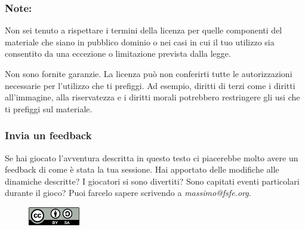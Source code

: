 \documentclass[letterpaper,twocolumn,openany,nodeprecatedcode]{dndbook}
\begin{document}
\subsubsection{Note:}

Non sei tenuto a rispettare i termini della licenza per quelle componenti del materiale che siano in pubblico dominio o nei casi in cui il tuo utilizzo sia consentito da una eccezione o limitazione prevista dalla legge.

Non sono fornite garanzie. La licenza può non conferirti tutte le autorizzazioni necessarie per l'utilizzo che ti prefiggi. Ad esempio, diritti di terzi come i diritti all'immagine, alla riservatezza e i diritti morali potrebbero restringere gli usi che ti prefiggi sul materiale.

\subsubsection{Invia un feedback}
Se hai giocato l'avventura descritta in questo testo ci piacerebbe molto avere un feedback di come è stata la tua sessione. Hai apportato delle modifiche alle dinamiche descritte? I giocatori si sono divertiti? Sono capitati eventi particolari durante il gioco? Puoi farcelo sapere scrivendo a \textit{massimo@fsfe.org}.

\begin{figure}
\centering
\includegraphics[width=0.2\textwidth]{img/by-sa.png}
\end{figure}

{}

\end{document}
